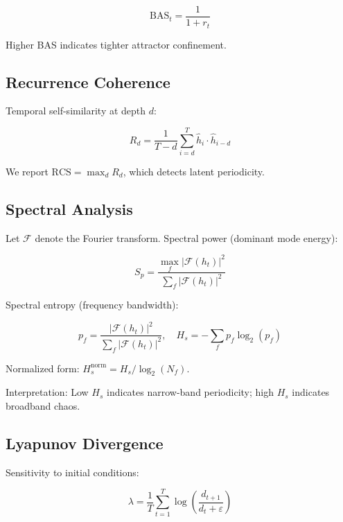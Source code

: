 \documentclass[12pt,a4paper]{article}
\begin{document}
\begin{equation}
\text{BAS}_t = \frac{1}{1 + r_t}
\end{equation}

Higher BAS indicates tighter attractor confinement.

\subsection{Recurrence Coherence}

Temporal self-similarity at depth $d$:

\begin{equation}
R_d = \frac{1}{T-d} \sum_{i=d}^{T} \hat{h}_i \cdot \hat{h}_{i-d}
\end{equation}

We report $\text{RCS} = \max_d R_d$, which detects latent periodicity.

\subsection{Spectral Analysis}

Let $\mathcal{F}$ denote the Fourier transform. Spectral power (dominant mode energy):

\begin{equation}
S_p = \frac{\max_f |\mathcal{F}(h_t)|^2}{\sum_f |\mathcal{F}(h_t)|^2}
\end{equation}

Spectral entropy (frequency bandwidth):

\begin{equation}
p_f = \frac{|\mathcal{F}(h_t)|^2}{\sum_f |\mathcal{F}(h_t)|^2}, \quad
H_s = -\sum_f p_f \log_2(p_f)
\end{equation}

Normalized form: $H_s^{\text{norm}} = H_s / \log_2(N_f)$.

Interpretation: Low $H_s$ indicates narrow-band periodicity; high $H_s$ indicates broadband chaos.

\subsection{Lyapunov Divergence}

Sensitivity to initial conditions:

\begin{equation}
\lambda = \frac{1}{T} \sum_{t=1}^{T} \log\left(\frac{d_{t+1}}{d_t + \varepsilon}\right)
\end{equation}
\end{document}
